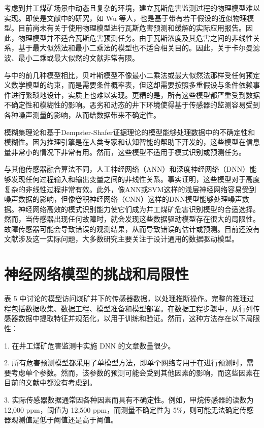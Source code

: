 \documentclass[lang=cn,a4paper,citestyle=gb7714-2015, bibstyle=gb7714-2015]{elegantpaper}
\newcommand{\mycite}[1]{\textsuperscript{\parencite{#1}}}
\begin{document}
    考虑到井工煤矿场景中动态且复杂的环境，建立瓦斯危害监测过程的物理模型难以实现。即使是文献中的研究，如 Wu 等人\mycite{Wu2018}，也是基于带有若干假设的近似物理模型。目前尚未有关于使用物理模型进行瓦斯危害预测和缓解的实际应用报告。因此，物理模型并不适合瓦斯危害预测任务。由于瓦斯浓度及其危害之间的非线性关系，基于最大似然法和最小二乘法的模型也不适合相关目的。因此，关于卡尔曼滤波、最小二乘或最大似然的文献非常有限。

    与中的前几种模型相比，贝叶斯模型不像最小二乘法或最大似然法那样受任何预定义数学模型的约束，而是需要条件概率表，但这却需要按照多重假设与条件依赖事件进行繁琐地设计，实质上也难以实现。更糟的是，所有这些模型都严重受到数据不确定性和模糊性的影响。恶劣和动态的井下环境使得基于传感器的监测容易受到各种噪声测量的影响，从而给数据带来不确定性。

    模糊集理论和基于Dempster-Shafer证据理论的模型能够处理数据中的不确定性和模糊性。因为推理引擎是在人类专家和认知智能的帮助下开发的，这些模型在信息量非常小的情况下非常有用。然而，这些模型不适用于模式识别或预测任务。

    与其他传感器融合算法不同，人工神经网络（ANN）和深度神经网络（DNN）能够发现任何过程输入和输出变量之间的非线性关系。事实证明，这些模型对于高度复杂的非线性过程非常有效。此外，像ANN或SVM这样的浅层神经网络容易受到噪声数据的影响，但像卷积神经网络（CNN）这样的DNN模型能够处理噪声数据。神经网络高效的模式识别能力使它们成为井工煤矿危害识别模型的合适选择。然而，当传感器出现任何故障时，就会发现这些数据驱动模型存在很大的局限性。故障传感器可能会导致错误的观测结果，从而导致错误的估计或预测。目前还没有文献涉及这一实际问题，大多数研究主要关注于设计通用的数据驱动模型。

    \section{神经网络模型的挑战和局限性}
    表 5 中讨论的模型访问煤矿井下的传感器数据，以处理推断操作。完整的推理过程包括数据收集、数据工程、模型准备和模型部署。在数据工程步骤中，从行列传感器数据中提取特征并规范化，以用于训练和验证。然而，这种方法存在以下局限性：

    1. 在井工煤矿危害监测中实施 DNN 的文章数量很少。

    2. 所有危害预测模型都采用了单模型方法，即单个网络专用于在进行预测时，需要考虑单个参数。然而，该参数的预测可能会受到其他因素的影响，而这些因素在目前的文献中都没有考虑到。

    3. 实际传感器数据通常因各种因素而具有不确定性。例如，甲烷传感器的读数为 12,000 ppm，阈值为 12,500 ppm，而测量不确定性为 5\%，则可能无法确定传感器观测值是低于阈值还是高于阈值。
\end{document}
